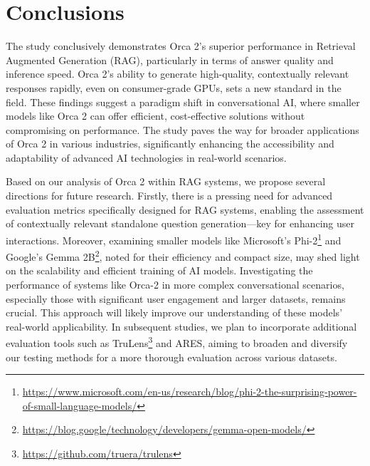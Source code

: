 \documentclass[runningheads]{llncs}
\begin{document}
\section{Conclusions}
\label{sec:Conclusions}
The study conclusively demonstrates Orca 2's superior performance in Retrieval Augmented Generation (RAG), particularly in terms of answer quality and inference speed. Orca 2's ability to generate high-quality, contextually relevant responses rapidly, even on consumer-grade GPUs, sets a new standard in the field. These findings suggest a paradigm shift in conversational AI, where smaller models like Orca 2 can offer efficient, cost-effective solutions without compromising on performance. The study paves the way for broader applications of Orca 2 in various industries, significantly enhancing the accessibility and adaptability of advanced AI technologies in real-world scenarios.

Based on our analysis of Orca 2 within RAG systems, we propose several directions for future research. Firstly, there is a pressing need for advanced evaluation metrics specifically designed for RAG systems, enabling the assessment of contextually relevant standalone question generation—key for enhancing user interactions. Moreover, examining smaller models like Microsoft's Phi-2\footnote{\url{https://www.microsoft.com/en-us/research/blog/phi-2-the-surprising-power-of-small-language-models/}} and Google's Gemma 2B\footnote{\url{https://blog.google/technology/developers/gemma-open-models/}}, noted for their efficiency and compact size, may shed light on the scalability and efficient training of AI models. Investigating the performance of systems like Orca-2 in more complex conversational scenarios, especially those with significant user engagement and larger datasets, remains crucial. This approach will likely improve our understanding of these models' real-world applicability. In subsequent studies, we plan to incorporate additional evaluation tools such as TruLens\footnote{\url{https://github.com/truera/trulens}} and ARES\cite{saad2023ares}, aiming to broaden and diversify our testing methods for a more thorough evaluation across various datasets.

\end{document}
